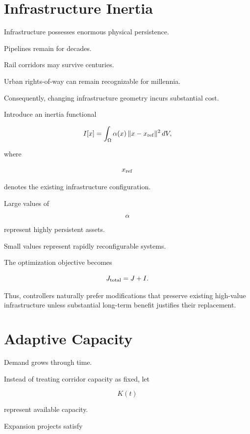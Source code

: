 \documentclass[11pt,fleqn]{book}
\numberwithin{equation}{chapter}
\theoremstyle{plain}
\theoremstyle{definition}
\theoremstyle{remark}
\begin{document}

\section{Infrastructure Inertia}

Infrastructure possesses enormous physical persistence.

Pipelines remain for decades.

Rail corridors may survive centuries.

Urban rights-of-way can remain recognizable for millennia.

Consequently, changing infrastructure geometry incurs substantial cost.

Introduce an inertia functional

\[
I[x]
=
\int_\Omega
\alpha(x)
\,
\|x-x_{\rm ref}\|^2
\,dV,
\]

where

\[
x_{\rm ref}
\]

denotes the existing infrastructure configuration.

Large values of

\[
\alpha
\]

represent highly persistent assets.

Small values represent rapidly reconfigurable systems.


The optimization objective becomes

\[
J_{\rm total}
=
J
+
I.
\]

Thus, controllers naturally prefer modifications that preserve existing
high-value infrastructure unless substantial long-term benefit justifies
their replacement.


\section{Adaptive Capacity}

Demand grows through time.

Instead of treating corridor capacity as fixed, let

\[
K(t)
\]

represent available capacity.

Expansion projects satisfy
\end{document}
